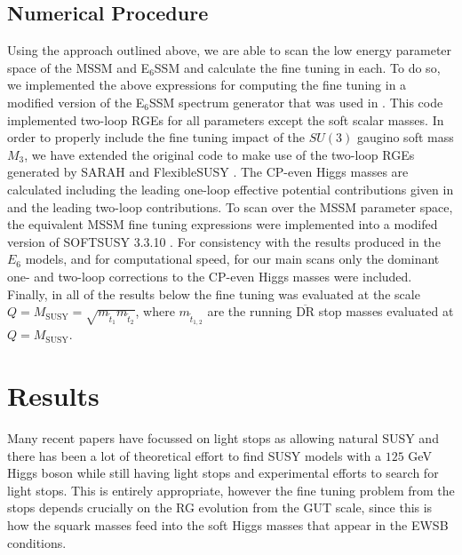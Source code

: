 \documentclass[preprint,amsmath,amssymb,aps,superscriptaddress,prd,showpacs,floatfix]{revtex4-1}
\begin{document}
\subsection{\label{subsec:numericalprocedure}Numerical Procedure}
Using the approach outlined above, we are able to scan the low energy parameter space of the MSSM and E$_6$SSM and calculate the fine tuning in each. To do so, we implemented the above expressions for computing the fine tuning in a modified version of the E$_6$SSM spectrum generator that was used in \cite{Athron:2013ipa}. This code implemented two-loop RGEs for all parameters except the soft scalar masses. In order to properly include the fine tuning impact of the $SU(3)$ gaugino soft mass $M_3$, we have extended the original code to make use of the two-loop RGEs generated by SARAH \cite{Staub:2009bi,Staub:2010jh,Staub:2012pb,Staub:2013tta} and FlexibleSUSY \cite{Athron:2014yba}. The CP-even Higgs masses are calculated including the leading one-loop effective potential contributions given in \cite{Athron:2009bs} and the leading two-loop contributions. To scan over the MSSM parameter space, the equivalent MSSM fine tuning expressions were implemented into a modifed version of SOFTSUSY 3.3.10 \cite{Allanach:2001kg,Allanach:2013kza}. For consistency with the results produced in the $E_6$ models, and for computational speed, for our main scans only the dominant one- and two-loop corrections to the CP-even Higgs masses were included. Finally, in all of the results below the fine tuning was evaluated at the scale $Q=M_{\textrm{SUSY}}=\sqrt{m_{\tilde{t}_1}m_{\tilde{t}_2}}$, where $m_{\tilde{t}_{1,2}}$ are the running $\overline{\textrm{DR}}$ stop masses evaluated at $Q=M_{\textrm{SUSY}}$. 

\section{\label{sec:results}Results}
Many recent papers have focussed on light stops as allowing natural
SUSY and there has been a lot of theoretical effort to find SUSY
models with a $125$ GeV Higgs boson while still having light stops
and experimental efforts to search for light stops.  This is entirely
appropriate, however the fine tuning problem from the stops depends
crucially on the RG evolution from the GUT scale, since this is how
the squark masses feed into the soft Higgs masses that appear in the
EWSB conditions.
\end{document}
